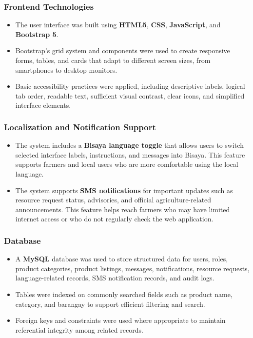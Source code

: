 \subsubsection*{Frontend Technologies}

\begin{itemize}
    \item The user interface was built using \textbf{HTML5}, \textbf{CSS}, \textbf{JavaScript}, and \textbf{Bootstrap 5}.
    
    \item Bootstrap's grid system and components were used to create responsive forms, tables, and cards that adapt to different screen sizes, from smartphones to desktop monitors.
    
    \item Basic accessibility practices were applied, including descriptive labels, logical tab order, readable text, sufficient visual contrast, clear icons, and simplified interface elements.
\end{itemize}

\subsubsection*{Localization and Notification Support}

\begin{itemize}
    \item The system includes a \textbf{Bisaya language toggle} that allows users to switch selected interface labels, instructions, and messages into Bisaya. This feature supports farmers and local users who are more comfortable using the local language.
    
    \item The system supports \textbf{SMS notifications} for important updates such as resource request status, advisories, and official agriculture-related announcements. This feature helps reach farmers who may have limited internet access or who do not regularly check the web application.
\end{itemize}

\subsubsection*{Database}

\begin{itemize}
    \item A \textbf{MySQL} database was used to store structured data for users, roles, product categories, product listings, messages, notifications, resource requests, language-related records, SMS notification records, and audit logs.
    
    \item Tables were indexed on commonly searched fields such as product name, category, and barangay to support efficient filtering and search.
    
    \item Foreign keys and constraints were used where appropriate to maintain referential integrity among related records.
\end{itemize}

